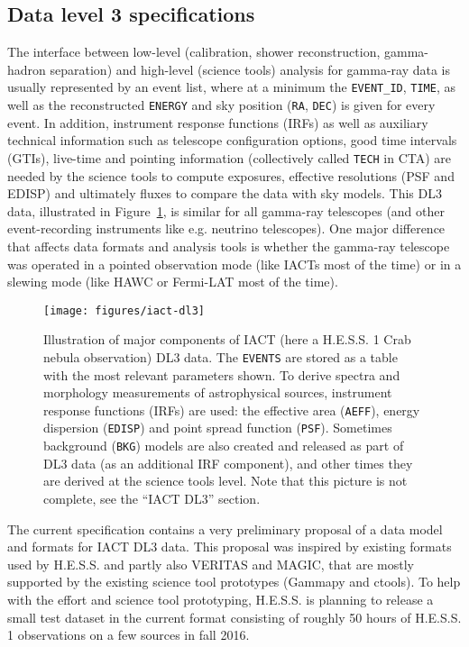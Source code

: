 \subsection{Data level 3 specifications}

The interface between low-level (calibration, shower reconstruction, gamma-hadron separation) and high-level (science tools) analysis for gamma-ray data is usually represented by an event list, where at a minimum the \texttt{EVENT\_ID}, \texttt{TIME}, as well as the reconstructed \texttt{ENERGY} and sky position (\texttt{RA}, \texttt{DEC}) is given for every event. In addition, instrument response functions (IRFs) as well as auxiliary technical information such as telescope configuration options, good time intervals (GTIs), live-time and pointing information (collectively called \texttt{TECH} in CTA) are needed by the science tools to compute exposures, effective resolutions (PSF and EDISP) and ultimately fluxes to compare the data with sky models. This DL3 data, illustrated in Figure~\ref{fig:iact-dl3}, is similar for all gamma-ray telescopes (and other event-recording instruments like e.g. neutrino telescopes). One major difference that affects data formats and analysis tools is whether the gamma-ray telescope was operated in a pointed observation mode (like IACTs most of the time) or in a slewing mode (like HAWC or Fermi-LAT most of the time).

\begin{figure}[tb]
\centerline{\texttt{[image: figures/iact-dl3]}}
\caption{
Illustration of major components of IACT (here a H.E.S.S. 1 Crab nebula observation) DL3 data. The \texttt{EVENTS} are stored as a table with the most relevant parameters shown. To derive spectra and morphology measurements of astrophysical sources, instrument response functions (IRFs) are used: the effective area (\texttt{AEFF}), energy dispersion (\texttt{EDISP}) and point spread function (\texttt{PSF}). Sometimes background (\texttt{BKG}) models are also created and released as part of DL3 data (as an additional IRF component), and other times they are derived at the science tools level. Note that this picture is not complete, see the ``IACT DL3'' section.
}
\label{fig:iact-dl3}
\end{figure}

The current specification contains a very preliminary proposal of a data model and formats for IACT DL3 data. This proposal was inspired by existing formats used by H.E.S.S. and partly also VERITAS and MAGIC, that are mostly supported by the existing science tool prototypes (Gammapy and ctools). To help with the \gadf effort and science tool prototyping, H.E.S.S. is planning to release a small test dataset in the current format consisting of roughly 50 hours of H.E.S.S. 1 observations on a few sources in fall 2016.

